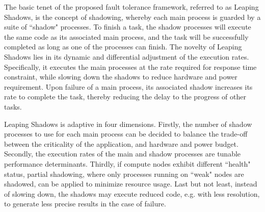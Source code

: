 
The basic tenet of the proposed fault tolerance framework, referred to as Leaping Shadows, is the concept of shadowing, whereby each main process is guarded by a suite of ``shadow" processes. To finish a task, the shadow processes will execute the same code as its associated main process, and the task will be successfully completed as long as one of the processes can finish. %
The novelty of Leaping Shadows lies in its dynamic and differential adjustment of the execution rates. Specifically, it 
executes the main processes at the rate required for response time constraint, while slowing down the shadows to reduce hardware and 
power requirement. Upon failure of a main process, 
its associated shadow increases its rate to complete the task, thereby reducing the delay to the progress of other tasks. 
 
Leaping Shadows is adaptive in four dimensions. Firstly, the number of shadow processes to use for each main process can be decided  
to balance the trade-off between the criticality of the application, and hardware and power budget. Secondly, the execution rates of the main and shadow processes are tunable performance determinants. Thirdly, if compute nodes exhibit different ``health" status, partial shadowing, where only processes running on ``weak" nodes are shadowed, can be applied to minimize resource usage. Last but not least, instead of slowing down, the shadows may execute reduced code, e.g. with less resolution, to generate less precise results in the case of failure.



